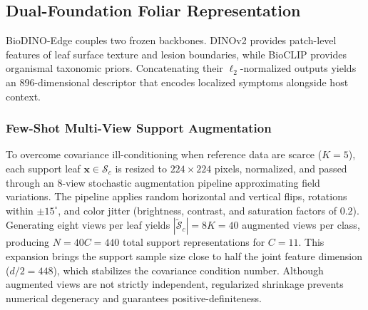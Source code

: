 \documentclass[preprint,12pt]{elsarticle}
\begin{document}
\subsection{Dual-Foundation Foliar Representation}
\label{sec:feature_extraction}
BioDINO-Edge couples two frozen backbones. DINOv2 provides patch-level features of leaf surface texture and lesion boundaries, while BioCLIP provides organismal taxonomic priors. Concatenating their $\ell_2$-normalized outputs yields an 896-dimensional descriptor that encodes localized symptoms alongside host context.

\subsubsection{Few-Shot Multi-View Support Augmentation}
To overcome covariance ill-conditioning when reference data are scarce ($K = 5$), each support leaf $\mathbf{x} \in \mathcal{S}_c$ is resized to $224 \times 224$ pixels, normalized, and passed through an 8-view stochastic augmentation pipeline approximating field variations. The pipeline applies random horizontal and vertical flips, rotations within $\pm 15^\circ$, and color jitter (brightness, contrast, and saturation factors of $0.2$). Generating eight views per leaf yields $|\tilde{\mathcal{S}}_c| = 8K = 40$ augmented views per class, producing $N = 40C = 440$ total support representations for $C = 11$. This expansion brings the support sample size close to half the joint feature dimension ($d/2 = 448$), which stabilizes the covariance condition number. Although augmented views are not strictly independent, regularized shrinkage prevents numerical degeneracy and guarantees positive-definiteness.
\end{document}
